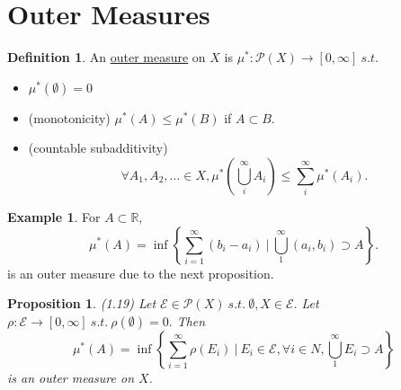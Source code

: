 \documentclass{report}
\newcommand{\R}{\mathbb{R}}
\newcommand{\st}{\ s.t.\ }
\newtheorem{proposition}[theorem]{Proposition}
\theoremstyle{definition}
\newtheorem{definition}[theorem]{Definition}
\newtheorem{example}[theorem]{Example}
\theoremstyle{remark}
\begin{document}
\section{Outer Measures}
\begin{definition}
An \underline{outer measure} on $X$ is $\mu^*: \mathcal{P}(X) \to [0, \infty] \st$
\begin{itemize}
\item
	$\mu^*(\emptyset) = 0$
\item(monotonicity)
	$\mu^*(A) \leq \mu^*(B)$ if $A \subset B.$
\item(countable subadditivity)
	\[\forall A_1, A_2, \ldots \in X, \mu^*\left(\bigcup_i^\infty A_i\right) \leq \sum_i^\infty \mu^*(A_i).\]
\end{itemize}
\end{definition}
\begin{example}
	For $A \subset \R$,
	\[\mu^*(A) = \inf\left\{\sum_{i=1}^\infty(b_i - a_i) \ \biggr\rvert\ \bigcup_1^\infty (a_i, b_i) \supset A\right\}.\]
	is an outer measure due to the next proposition.
\end{example}
\begin{proposition}\label{prop:induce}(1.19)
Let $\mathcal{E} \in \mathcal{P}(X) \st \emptyset, X \in \mathcal{E}.$
Let $\rho: \mathcal{E} \to [0, \infty] \st \rho(\emptyset) = 0.$
Then
\[
\mu^*(A) = \inf\left\{\sum_{i=1}^\infty \rho(E_i) \ \biggr\rvert\ E_i \in \mathcal{E}, \forall i \in N, \bigcup_1^\infty E_i \supset A\right\}\]
is an outer measure on $X$.
\end{proposition}
\end{document}
